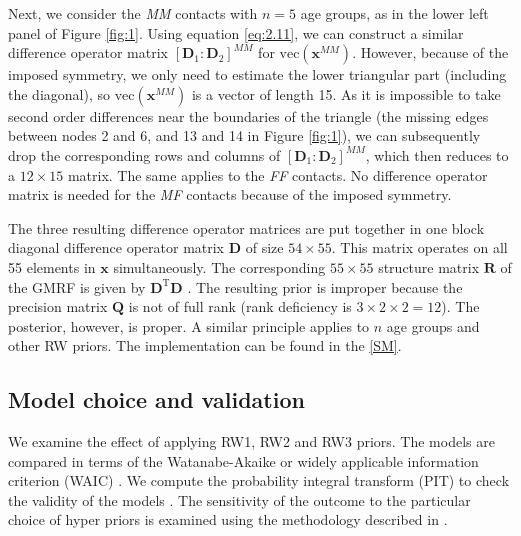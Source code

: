 \documentclass[aoas,preprint]{imsart}
\numberwithin{equation}{section}
\begin{document}
Next, we consider the \textit{MM} contacts with $n = 5$ age groups, as in the lower left panel of Figure \ref{fig:1}. Using equation \ref{eq:2.11}, we can construct a similar difference operator matrix $[\bm{D}_1 : \bm{D}_2]^\textit{MM}$ for $\text{vec}(\bm{x}^\textit{MM})$. However, because of the imposed symmetry, we only need to estimate the lower triangular part (including the diagonal), so $\text{vec}(\bm{x}^\textit{MM})$ is a vector of length 15. As it is impossible to take second order differences near the boundaries of the triangle (the missing edges between nodes 2 and 6, and 13 and 14 in Figure \ref{fig:1}), we can subsequently drop the corresponding rows and columns of $[\bm{D}_1 : \bm{D}_2]^\textit{MM}$, which then reduces to a $12 \times 15$ matrix. The same applies to the \textit{FF} contacts. No difference operator matrix is needed for the \textit{MF} contacts because of the imposed symmetry.

The three resulting difference operator matrices are put together in one block diagonal difference operator matrix $\bm{D}$ of size $54 \times 55$. This matrix operates on all 55 elements in $\bm{x}$ simultaneously. The corresponding $55 \times 55$ structure matrix $\bm{R}$ of the GMRF is given by $\bm{D}^\text{T}\bm{D}$ \citep{rue_gaussian_2005}. The resulting prior is improper because the precision matrix $\bm{Q}$ is not of full rank (rank deficiency is $3 \times 2 \times 2 = 12$). The posterior, however, is proper. A similar principle applies to $n$ age groups and other RW priors. The implementation can be found in the \ref{SM}.

\subsection{Model choice and validation}

We examine the effect of applying RW1, RW2 and RW3 priors. The models are compared in terms of the Watanabe-Akaike or widely applicable information criterion (WAIC) \citep{watanabe_widely_2013}. We compute the probability integral transform (PIT) to check the validity of the models \citep{dawid_present_1984}. The sensitivity of the outcome to the particular choice of hyper priors is examined using the methodology described in \cite{roos_sensitivity_2015}.
\end{document}
